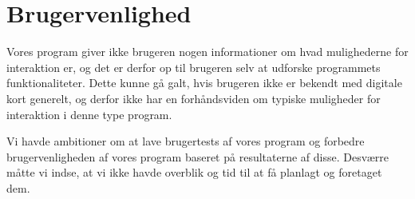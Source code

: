 \section{Brugervenlighed}
\label{sec:brugervenlighed}

Vores program giver ikke brugeren nogen informationer om hvad mulighederne for interaktion er, og det er derfor op til brugeren selv at udforske programmets funktionaliteter. Dette kunne gå galt, hvis brugeren ikke er bekendt med digitale kort generelt, og derfor ikke har en forhåndsviden om typiske muligheder for interaktion i denne type program. 

Vi havde ambitioner om at lave brugertests af vores program og forbedre brugervenligheden af vores program baseret på resultaterne af disse. Desværre måtte vi indse, at vi ikke havde overblik og tid til at få planlagt og foretaget dem.